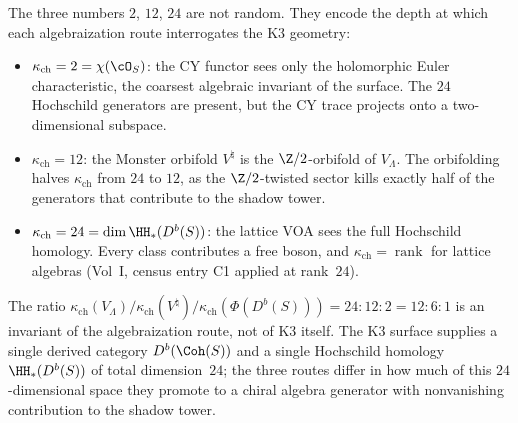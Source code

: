 The three numbers $2$, $12$, $24$ are not random.
They encode the depth at which each algebraization route interrogates the K3 geometry:
\begin{itemize}
\item $\kappa_{\mathrm{ch}} = 2 = \chi(\cO_S)$: the CY functor sees only the
 holomorphic Euler characteristic, the coarsest algebraic invariant of the surface.
 The $24$ Hochschild generators are present, but the CY trace projects onto a
 two-dimensional subspace.
\item $\kappa_{\mathrm{ch}} = 12$: the Monster orbifold $V^\natural$ is the
 $\Z/2$-orbifold of $V_\Lambda$. The orbifolding halves $\kappa_{\mathrm{ch}}$
 from $24$ to $12$, as the $\Z/2$-twisted sector kills exactly half of the
 generators that contribute to the shadow tower.
\item $\kappa_{\mathrm{ch}} = 24 = \dim \HH_*(D^b(S))$: the lattice VOA sees
 the full Hochschild homology. Every class contributes a free boson, and
 $\kappa_{\mathrm{ch}} = \operatorname{rank}$ for lattice algebras
 (Vol~I, census entry C1 applied at rank~$24$).
\end{itemize}
The ratio $\kappa_{\mathrm{ch}}(V_\Lambda) / \kappa_{\mathrm{ch}}(V^\natural) /
\kappa_{\mathrm{ch}}(\Phi(D^b(S))) = 24 : 12 : 2 = 12 : 6 : 1$
is an invariant of the algebraization route, not of K3 itself. The K3 surface
supplies a single derived category $D^b(\Coh(S))$ and a single Hochschild homology
$\HH_*(D^b(S))$ of total dimension~$24$; the three routes differ in how much of
this $24$-dimensional space they promote to a chiral algebra generator with
nonvanishing contribution to the shadow tower.

